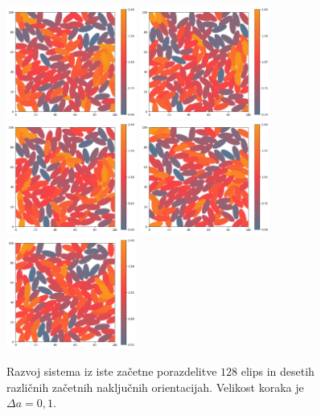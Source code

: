 \begin{figure}[!ht]
    \includegraphics[width=0.38\textwidth]{./figures/runs/delta_a_01/run06}
    \includegraphics[width=0.38\textwidth]{./figures/runs/delta_a_01/run07}
    \includegraphics[width=0.38\textwidth]{./figures/runs/delta_a_01/run08}
    \includegraphics[width=0.38\textwidth]{./figures/runs/delta_a_01/run09}
    \includegraphics[width=0.38\textwidth]{./figures/runs/delta_a_01/run10}
    \caption{Razvoj sistema iz iste začetne porazdelitve $128$ elips in desetih različnih
    začetnih naključnih orientacijah. Velikost koraka je $\Delta a = 0,1$.}
    \label{fig:delta_a_01}
\end{figure}
